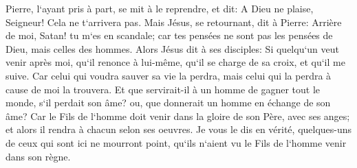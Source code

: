 \verse Pierre, l`ayant pris à part, se mit à le reprendre, et dit: A Dieu ne plaise, Seigneur! Cela ne t`arrivera pas. 
\verse Mais Jésus, se retournant, dit à Pierre: Arrière de moi, Satan! tu m`es en scandale; car tes pensées ne sont pas les pensées de Dieu, mais celles des hommes. 
\verse Alors Jésus dit à ses disciples: Si quelqu`un veut venir après moi, qu`il renonce à lui-même, qu`il se charge de sa croix, et qu`il me suive. 
\verse Car celui qui voudra sauver sa vie la perdra, mais celui qui la perdra à cause de moi la trouvera. 
\verse Et que servirait-il à un homme de gagner tout le monde, s`il perdait son âme? ou, que donnerait un homme en échange de son âme? 
\verse Car le Fils de l`homme doit venir dans la gloire de son Père, avec ses anges; et alors il rendra à chacun selon ses oeuvres. 
\verse Je vous le dis en vérité, quelques-uns de ceux qui sont ici ne mourront point, qu`ils n`aient vu le Fils de l`homme venir dans son règne. 

\chapter{}


